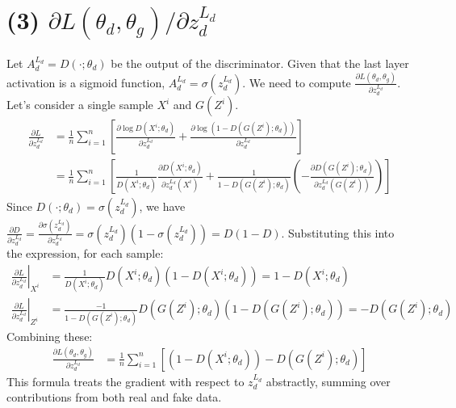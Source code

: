 \documentclass[11pt, a4paper, oneside]{memoir}
\begin{document}
\section*{(3) $\partial L(\theta_d, \theta_g) / \partial z^{L_d}_d$}
Let $A^{L_d}_d = D(\cdot; \theta_d)$ be the output of the discriminator. Given that the last layer activation is a sigmoid function, $A^{L_d}_d = \sigma(z^{L_d}_d)$.
We need to compute $\frac{\partial L (\theta_d, \theta_g)}{\partial z^{L_d}_d}$. Let's consider a single sample $X^i$ and $G(Z^i)$.
\begin{align*}
\frac{\partial L}{\partial z^{L_d}_d} &= \frac{1}{n}\sum_{i=1}^{n} \left[ \frac{\partial \log D(X^i; \theta_d)}{\partial z^{L_d}_d} + \frac{\partial \log (1 - D(G(Z^i); \theta_d))}{\partial z^{L_d}_d} \right] \\
&= \frac{1}{n}\sum_{i=1}^{n} \left[ \frac{1}{D(X^i; \theta_d)} \frac{\partial D(X^i; \theta_d)}{\partial z^{L_d}_d(X^i)} + \frac{1}{1 - D(G(Z^i); \theta_d)} \left( - \frac{\partial D(G(Z^i); \theta_d)}{\partial z^{L_d}_d(G(Z^i))} \right) \right]
\end{align*}
Since $D(\cdot; \theta_d) = \sigma(z^{L_d}_d)$, we have $\frac{\partial D}{\partial z^{L_d}_d} = \frac{\partial \sigma(z^{L_d}_d)}{\partial z^{L_d}_d} = \sigma(z^{L_d}_d)(1 - \sigma(z^{L_d}_d)) = D(1 - D)$.
Substituting this into the expression, for each sample:
\begin{align*}
    \left. \frac{\partial L}{\partial z^{L_d}_d} \right|_{X^i} &= \frac{1}{D(X^i; \theta_d)} D(X^i; \theta_d) (1 - D(X^i; \theta_d)) = 1 - D(X^i; \theta_d) \\
    \left. \frac{\partial L}{\partial z^{L_d}_d} \right|_{Z^i} &= \frac{-1}{1 - D(G(Z^i); \theta_d)} D(G(Z^i); \theta_d) (1 - D(G(Z^i); \theta_d)) = -D(G(Z^i); \theta_d)
\end{align*}
Combining these:
\begin{align*}
    \frac{\partial L (\theta_d, \theta_g)}{\partial z^{L_d}_d} &= \frac{1}{n}\sum_{i=1}^{n} \left[ (1 - D(X^i; \theta_d)) - D(G(Z^i); \theta_d) \right]
\end{align*}
This formula treats the gradient with respect to $z^{L_d}_d$ abstractly, summing over contributions from both real and fake data.
\end{document}

